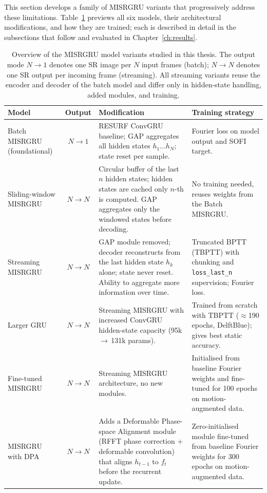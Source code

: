This section develops a family of MISRGRU variants that progressively address these
limitations. Table~\ref{tab:misrgru_variants} previews all six models, their architectural
modifications, and how they are trained; each is described in detail in the subsections that
follow and evaluated in Chapter~\ref{ch:results}.

\begin{table}[htbp]
  \centering
  \caption{Overview of the MISRGRU model variants studied in this thesis. The output mode
  $N{\to}1$ denotes one SR image per $N$ input frames (batch); $N{\to}N$ denotes one SR
  output per incoming frame (streaming). All streaming variants reuse the encoder and decoder
  of the batch model and differ only in hidden-state handling, added modules, and training.}
  \label{tab:misrgru_variants}
  \small
  \begin{tabularx}{\linewidth}{@{}l c X X@{}}
    \toprule
    \textbf{Model} & \textbf{Output} & \textbf{Modification} & \textbf{Training strategy} \\
    \midrule
    Batch MISRGRU (foundational) & $N{\to}1$  &
    RESURF\cite{resurf2024} ConvGRU baseline; GAP aggregates all hidden states $h_1\dots h_N$;
    state reset per sample. &
    Fourier loss on model output and SOFI target.\\
    \addlinespace
    Sliding-window MISRGRU & $N{\to}N$ &
    Circular buffer of the last $n$ hidden states; hidden states are cached only $n$-th is computed. 
    GAP aggregates only the windowed states before decoding. &
    No training needed, reuses weights from the Batch MISRGRU. \\
    \addlinespace
    Streaming MISRGRU & $N{\to}N$ &
    GAP module removed; decoder reconstructs from the last hidden state $h_k$ alone; state
    never reset. Ability to aggregate more information over time. &
    Truncated BPTT (TBPTT) with chunking and \texttt{loss\_last\_n} supervision; Fourier loss. \\
    \addlinespace
    Larger GRU & $N{\to}N$ &
    Streaming MISRGRU with increased ConvGRU hidden-state capacity (95k\,$\to$\,131k params). &
    Trained from scratch with TBPTT ($\approx$190 epochs, DelftBlue); gives best static accuracy. \\
    \addlinespace
    Fine-tuned MISRGRU & $N{\to}N$ &
    Streaming MISRGRU architecture, no new modules. &
    Initialised from baseline Fourier weights and fine-tuned for 100 epochs on
    motion-augmented data. \\
    \addlinespace
    MISRGRU with DPA & $N{\to}N$ &
    Adds a Deformable Phase-space Alignment module (RFFT phase correction + deformable
    convolution) that aligns $h_{t-1}$ to $f_t$ before the recurrent update. &
    Zero-initialised module fine-tuned from baseline Fourier weights for 300 epochs on
    motion-augmented data. \\
    \bottomrule
  \end{tabularx}
\end{table}

